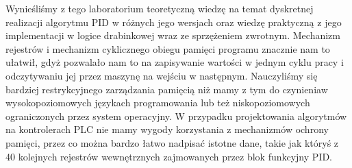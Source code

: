 \documentclass[a4paper, 12pt]{article}
\begin{document}
		Wynieśliśmy z tego laboratorium teoretyczną wiedzę na temat dyskretnej realizacji algorytmu PID w różnych jego wersjach oraz wiedzę praktyczną z jego implementacji w logice drabinkowej wraz ze sprzężeniem zwrotnym. Mechanizm rejestrów i mechanizm cyklicznego obiegu pamięci programu znacznie nam to ułatwił, gdyż pozwalało nam to na zapisywanie wartości w jednym cyklu pracy i odczytywaniu jej przez maszynę na wejściu w następnym.
		\newline 
		\newline
		Nauczyliśmy się bardziej restrykcyjnego zarządzania pamięcią niż mamy z tym do czynienia\linebreak w wysokopoziomowych językach programowania lub też niskopoziomowych ograniczonych przez system operacyjny. W przypadku projektowania algorytmów na kontrolerach PLC nie mamy wygody korzystania z mechanizmów ochrony pamięci, przez co można bardzo łatwo nadpisać istotne dane, takie jak któryś z 40 kolejnych rejestrów wewnętrznych zajmowanych przez blok funkcyjny PID.
\end{document}
